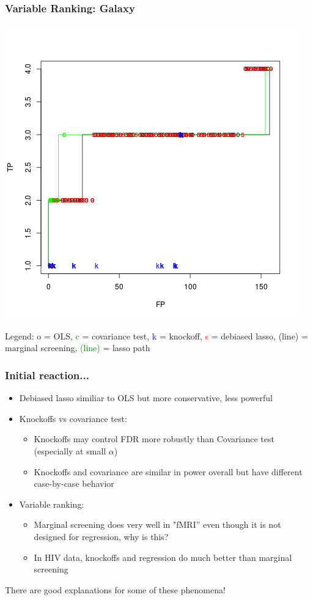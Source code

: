 \documentclass{beamer}
\begin{document}
\begin{frame}
\frametitle{Variable Ranking: Galaxy}
\begin{center}
\includegraphics[scale = 0.35]{gal_tvf.png}
\end{center}

Legend: o = OLS, \textcolor{green}{c} = covariance test,
\textcolor{blue}{k} = knockoff, \textcolor{red}{s} = debiased lasso,
(line) = marginal screening, \textcolor{green}{(line)} = lasso path
\end{frame}


\begin{frame}
\frametitle{Initial reaction...}
\begin{itemize}
\item Debiased lasso similiar to OLS but more conservative, less powerful
\item Knockoffs vs covariance test:
\begin{itemize}
\item Knockoffs may control FDR more robustly than Covariance test (especially at small $\alpha$)
\item Knockoffs and covariance are similar in power overall but have different case-by-case behavior
\end{itemize}
\item Variable ranking:
\begin{itemize}
\item Marginal screening does very well in "fMRI'' even though it is not designed for regression, why is this?
\item In HIV data, knockoffs and regression do much better than marginal screening
\end{itemize}
\end{itemize}
There are good explanations for some of these phenomena!
\end{frame}
\end{document}
